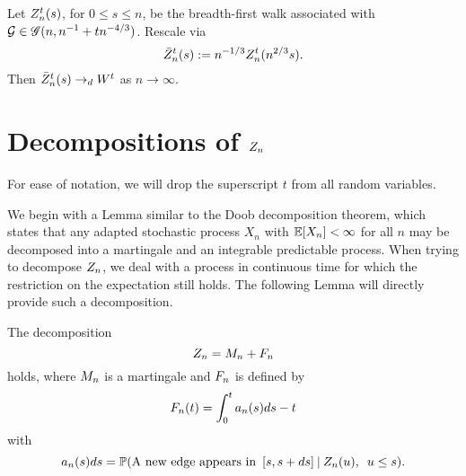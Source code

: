 \begin{theorem} \label{T: Z -> W}
	Let $Z_n^t(s)$, for $0 \leq s \leq n$, 
	be the breadth-first walk associated with $\mathcal{G} \in \mathscr{G}(n, n^{-1} + tn^{-4/3})$.
	Rescale via
	\begin{equation*}
	\bar{Z}_n^t(s) := n^{-1 / 3} Z_n^t(n^{2 / 3}s).
	\end{equation*}
	Then $\bar{Z}_n^t(s) \rightarrow_d W^t$ as $n \rightarrow \infty$.
\end{theorem}



\section{Decompositions of $Z_n$}

For ease of notation, we will drop the superscript $t$ from all random variables.



We begin with a Lemma similar to the Doob decomposition theorem,
which states that any adapted stochastic process $X_n$ with $\mathbb{E}[X_n] < \infty$ for all $n$
may be decomposed into a martingale and an integrable predictable process.
When trying to decompose $Z_n$, we deal with a process in continuous time for which the restriction on the expectation still holds.
The following Lemma will directly provide such a decomposition.

\begin{lemma} \label{L: decomp Zn}
	The decomposition 
	\begin{equation} \label{E: decomp Zn}
	Z_n = M_n + F_n
	\end{equation}
	holds, where $M_n$ is a martingale and $F_n$ is defined by
	\begin{equation} \label{D: An}
	F_n(t) = \int_{0}^{t} a_n(s)ds - t
	\end{equation}
	with
	\begin{equation} \label{D: an}
	a_n(s)ds = \mathbb{P}(\text{A new edge appears in} \enspace [s, s+ds] \: | \: Z_n(u), \enspace u \leq s).
	\end{equation}
\end{lemma}

